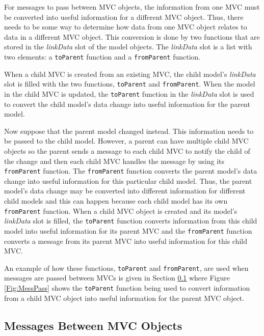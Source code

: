 \documentclass{article}[11pt]
\newcommand{\Rfunction}[1]{{\texttt{#1}}}
\newcommand{\Rslot}[1]{\textsl{#1}}
\begin{document}
For messages to pass between MVC objects, the information from one MVC must be
converted into useful information for a different MVC object.  Thus, there
needs to be some way to determine how data from one MVC object relates to data
in a different MVC object.  This conversion is done by two functions that are
stored in the \Rslot{linkData} slot of the model objects.  The
\Rslot{linkData} slot is a list with two elements: a \Rfunction{toParent}
function and a \Rfunction{fromParent} function.  

When a child MVC is created from an existing MVC, the child model's
\Rslot{linkData} slot is filled with the two functions,
\Rfunction{toParent} and \Rfunction{fromParent}.  When the model in the child
MVC is updated, the \Rfunction{toParent} function in the \Rslot{linkData} slot
is used to convert the child model's data change into useful information
for the parent model.  

Now suppose that the parent model changed instead.  This information
needs to be passed to the child model.  However, a parent can have multiple
child MVC objects so the parent sends a message to each child MVC to notify
the child of the change and then each child MVC handles the message by using
its \Rfunction{fromParent} function.  The \Rfunction{fromParent} function
converts the parent model's data change into useful information for this
particular child model.  Thus, the parent model's data change may be converted
into different information for different child models and this can happen
because each child model has its own \Rfunction{fromParent} function.  When a
child MVC object is created and its model's \Rslot{linkData} slot is filled,
the \Rfunction{toParent} function converts information from this child model
into useful information for its parent MVC and the \Rfunction{fromParent}
function converts a message from its parent MVC into useful information for
this child MVC.

An example of how these functions, \Rfunction{toParent} and
\Rfunction{fromParent}, are used when messages are passed between MVCs is
given in Section \ref{Ssec:MultMess} where Figure \ref{Fig:MessPass} shows the
\Rfunction{toParent} function being used to convert information from a child
MVC object into useful information for the parent MVC object.

\subsection{Messages Between MVC Objects}\label{Ssec:MultMess}
\end{document}
